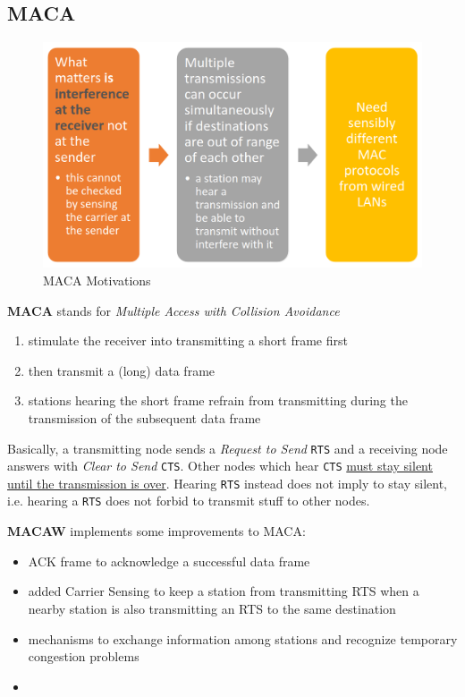 \subsection{MACA}
\begin{figure}[htbp]
   \centering
   \includegraphics{images/MACA_motivations.png}
   \caption{MACA Motivations}
   \label{fig:MACA_motivations}
\end{figure}

\textbf{MACA} stands for \textit{Multiple Access with Collision Avoidance}
\begin{enumerate}
   \item stimulate the receiver into transmitting a short
   frame first
   \item then transmit a (long) data frame
   \item stations hearing the short frame refrain from
   transmitting during the transmission of the
   subsequent data frame
\end{enumerate}

Basically, a transmitting node sends a \textit{Request to Send} \texttt{RTS} and a receiving node answers with \textit{Clear to Send} \texttt{CTS}.
Other nodes which hear \texttt{CTS} \ul{must stay silent until the transmission is over}.
Hearing \texttt{RTS} instead does not imply to stay silent, i.e. hearing a \texttt{RTS} does not forbid to transmit stuff to other nodes.

\nl

\textbf{MACAW} implements some improvements to MACA:
\begin{itemize}
   \item ACK frame to acknowledge a
   successful data frame
   \item added Carrier Sensing to keep a station from
   transmitting RTS when a nearby station is also
   transmitting an RTS to the same destination
   \item mechanisms to exchange information among
   stations and recognize temporary congestion
   problems
   \item[] 
\end{itemize}